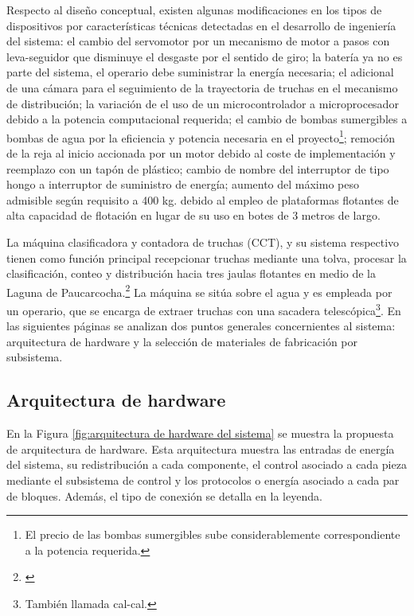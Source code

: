Respecto al diseño conceptual, existen algunas modificaciones en los tipos de dispositivos por características técnicas detectadas en el desarrollo de ingeniería del sistema: el cambio del servomotor por un mecanismo de motor a pasos con leva-seguidor que disminuye el desgaste por el sentido de giro; la batería ya no es parte del sistema, el operario debe suministrar la energía necesaria; el adicional de una cámara para el seguimiento de la trayectoria de truchas en el mecanismo de distribución; la variación de el uso de un microcontrolador a microprocesador debido a la potencia computacional requerida; el cambio de bombas sumergibles a bombas de agua por la eficiencia y potencia necesaria en el proyecto\footnote{El precio de las bombas sumergibles sube considerablemente correspondiente a la potencia requerida.}; remoción de la reja al inicio accionada por un motor debido al coste de implementación y reemplazo con un tapón de plástico; cambio de nombre del interruptor de tipo hongo a interruptor de suministro de energía; aumento del máximo peso admisible según requisito a 400 kg. debido al empleo de plataformas flotantes de alta capacidad de flotación en lugar de su uso en botes de 3 metros de largo.



La máquina clasificadora y contadora de truchas (CCT), y su sistema respectivo tienen como función principal recepcionar truchas mediante una tolva, procesar la clasificación, conteo y distribución hacia tres jaulas flotantes en medio de la Laguna de Paucarcocha.\footnote{\cite{DiazVergara2020}} La máquina se sitúa sobre el agua y es empleada por un operario, que se encarga de extraer truchas con una sacadera telescópica\footnote{También llamada cal-cal.}. En las siguientes páginas se analizan dos puntos generales concernientes al sistema: arquitectura de hardware y la selección de materiales de fabricación por subsistema.

\subsection{Arquitectura de hardware}

En la Figura \ref{fig:arquitectura de hardware del sistema} se muestra la propuesta de arquitectura de hardware. Esta arquitectura muestra las entradas de energía del sistema, su redistribución a cada componente, el control asociado a cada pieza mediante el subsistema de control y los protocolos o energía asociado a cada par de bloques. Además, el tipo de conexión se detalla en la leyenda. 

